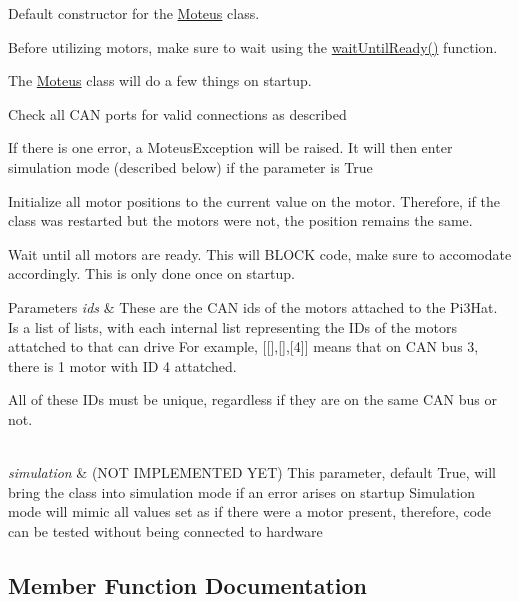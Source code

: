 Default constructor for the \hyperlink{classMoteus_1_1Moteus}{Moteus} class. 

Before utilizing motors, make sure to wait using the \hyperlink{classMoteus_1_1Moteus_a363a7881500b2ca7efccc6dfd64dca42}{wait\+Until\+Ready()} function.

The \hyperlink{classMoteus_1_1Moteus}{Moteus} class will do a few things on startup.
\begin{DoxyItemize}
\item Check all C\+AN ports for valid connections as described
\begin{DoxyItemize}
\item If there is one error, a Moteus\+Exception will be raised. It will then enter simulation mode (described below) if the parameter is True
\end{DoxyItemize}
\item Initialize all motor positions to the current value on the motor. Therefore, if the class was restarted but the motors were not, the position remains the same.
\item Wait until all motors are ready. This will B\+L\+O\+CK code, make sure to accomodate accordingly. This is only done once on startup. 
\begin{DoxyParams}{Parameters}
{\em ids} & These are the C\+AN ids of the motors attached to the Pi3\+Hat. Is a list of lists, with each internal list representing the I\+Ds of the motors attatched to that can drive For example, \mbox{[}\mbox{[}\mbox{]},\mbox{[}\mbox{]},\mbox{[}4\mbox{]}\mbox{]} means that on C\+AN bus 3, there is 1 motor with ID 4 attatched.
\begin{DoxyItemize}
\item All of these I\+Ds must be unique, regardless if they are on the same C\+AN bus or not. 
\end{DoxyItemize}\\
\hline
{\em simulation} & (N\+OT I\+M\+P\+L\+E\+M\+E\+N\+T\+ED Y\+ET) This parameter, default True, will bring the class into simulation mode if an error arises on startup Simulation mode will mimic all values set as if there were a motor present, therefore, code can be tested without being connected to hardware \\
\hline
\end{DoxyParams}

\end{DoxyItemize}

\subsection{Member Function Documentation}
\mbox{\label{classMoteus_1_1Moteus_a2e5bafddee5cfb9833f14ebf5e12f354}} 
